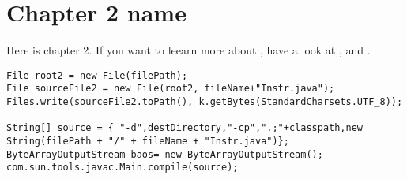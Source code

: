 \chapter{Chapter 2 name}\label{ch:ch2label}
Here is chapter 2. If you want to leearn  more about \LaTeXe{}, have a look at \cite{Madsen2010}, \cite{Oetiker2010} and \cite{Mittelbach2005}.

\lstset{language=Java}          %
\begin{lstlisting}[caption={Testing how to print code!}]  % Start your code-block
File root2 = new File(filePath);
File sourceFile2 = new File(root2, fileName+"Instr.java");
Files.write(sourceFile2.toPath(), k.getBytes(StandardCharsets.UTF_8));

String[] source = { "-d",destDirectory,"-cp",".;"+classpath,new String(filePath + "/" + fileName + "Instr.java")};
ByteArrayOutputStream baos= new ByteArrayOutputStream();
com.sun.tools.javac.Main.compile(source);
\end{lstlisting}